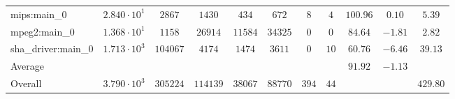 \begin{tabular}{|l|c|c|c|c|c|c|c|c|c|c|}
mips:main\_0            & $ 2.840 \cdot 10^{1} $ & $ 2867   $ & $ 1430   $ & $ 434   $ & $ 672   $ & $ 8   $ & $ 4  $ & $ 100.96      $ & $ 0.10    $ & $ 5.39    $ \\
mpeg2:main\_0           & $ 1.368 \cdot 10^{1} $ & $ 1158   $ & $ 26914  $ & $ 11584 $ & $ 34325 $ & $ 0   $ & $ 0  $ & $ 84.64       $ & $ -1.81   $ & $ 2.82    $ \\
sha\_driver:main\_0     & $ 1.713 \cdot 10^{3} $ & $ 104067 $ & $ 4174   $ & $ 1474  $ & $ 3611  $ & $ 0   $ & $ 10 $ & $ 60.76       $ & $ -6.46   $ & $ 39.13   $ \\
\hline
Average                 & $                    $ & $        $ & $        $ & $       $ & $       $ & $     $ & $    $ & $ 91.92       $ & $ -1.13   $ & $         $ \\
\hline
Overall                 & $ 3.790 \cdot 10^{3} $ & $ 305224 $ & $ 114139 $ & $ 38067 $ & $ 88770 $ & $ 394 $ & $ 44 $ & $             $ & $         $ & $ 429.80  $ \\
\hline
\end{tabular}
